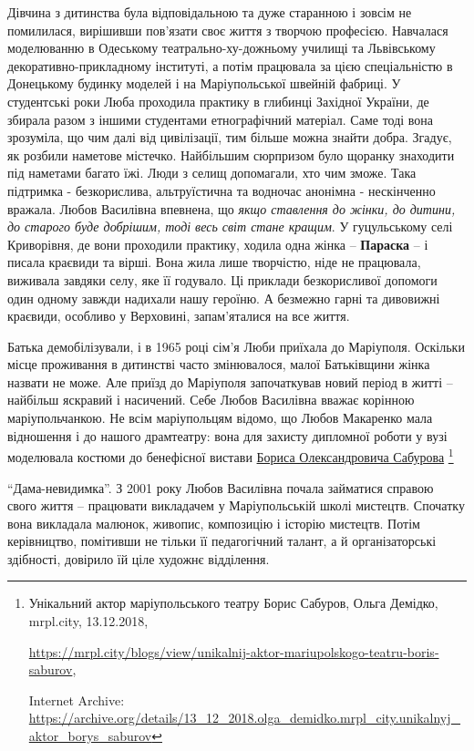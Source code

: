 
Дівчина з дитинства була відповідальною та дуже старанною і зовсім не
помилилася, вирішивши пов'язати своє життя з творчою професією. Навчалася
моделюванню в Одеському театрально-ху\hyp{}дожньому училищі та Львівському
декоративно-прикладному інституті, а потім працювала за цією спеціальністю в
Донецькому будинку моделей і на Маріупольської швейній фабриці. У студентські
роки Люба проходила практику в глибинці Західної України, де збирала разом з
іншими студентами етнографічний матеріал. Саме тоді вона зрозуміла, що чим далі
від цивілізації, тим більше можна знайти добра. Згадує, як розбили наметове
містечко. Найбільшим сюрпризом було щоранку знаходити під наметами багато їжі.
Люди з селищ допомагали, хто чим зможе. Така підтримка - безкорислива,
альтруїстична та водночас анонімна - нескінченно вражала. Любов Василівна
впевнена, що \emph{якщо ставлення до жінки, до дитини, до старого буде добрішим, тоді
весь світ стане кращим}. У гуцульському селі Криворівня, де вони проходили
практику, ходила одна жінка – \textbf{Параска} – і писала краєвиди та вірші. Вона жила
лише творчістю, ніде не працювала, виживала завдяки селу, яке її годувало. Ці
приклади безкорисливої допомоги один одному завжди надихали нашу героїню. А
безмежно гарні та дивовижні краєвиди, особливо у Верховині, запам'яталися на
все життя.

Батька демобілізували, і в 1965 році сім'я Люби приїхала до Маріуполя. Оскільки
місце проживання в дитинстві часто змінювалося, малої Батьківщини жінка назвати
не може. Але приїзд до Маріуполя започаткував новий період в житті – найбільш
яскравий і насичений. Себе Любов Василівна вважає корінною маріупольчанкою. Не
всім маріупольцям відомо, що Любов Макаренко мала відношення і до нашого
драмтеатру: вона для захисту дипломної роботи у вузі моделювала костюми до
бенефісної вистави \href{https://archive.org/details/13_12_2018.olga_demidko.mrpl_city.unikalnyj_aktor_borys_saburov}{Бориса Олександровича Сабурова}%
\footnote{Унікальний актор маріупольського театру Борис Сабуров, Ольга Демідко, mrpl.city, 13.12.2018, \par%
\url{https://mrpl.city/blogs/view/unikalnij-aktor-mariupolskogo-teatru-boris-saburov}, \par%
Internet Archive: \url{https://archive.org/details/13_12_2018.olga_demidko.mrpl_city.unikalnyj_aktor_borys_saburov}
}

\enquote{Дама-невидимка}. З 2001 року
Любов Василівна почала займатися справою свого життя – працювати викладачем у
Маріупольській школі мистецтв. Спочатку вона викладала малюнок, живопис,
композицію і історію мистецтв. Потім керівництво, помітивши не тільки її
педагогічний талант, а й організаторські здібності, довірило їй ціле художнє
відділення.

